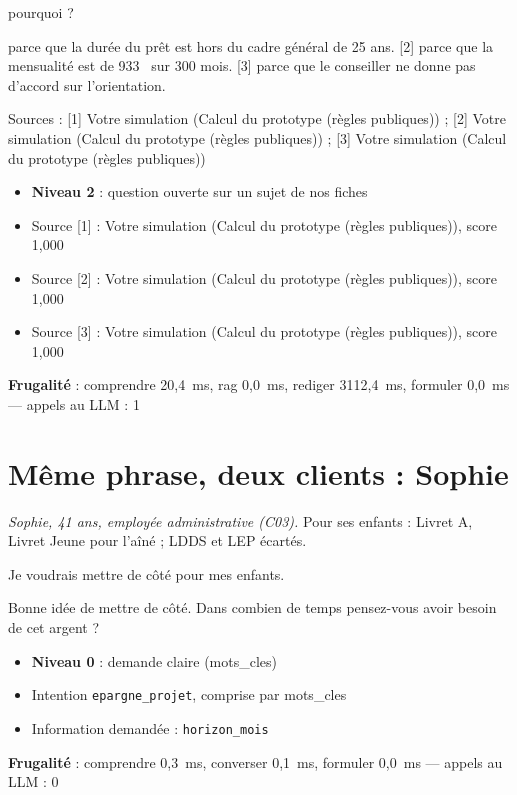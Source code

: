 \documentclass[11pt,a4paper]{article}
\newcommand{\frugal}[1]{{\scriptsize\color{darkgray}\textbf{Frugalité} : #1}\par\medskip}
\begin{document}
\begin{client}pourquoi ?\end{client}
\begin{assistant}parce que la durée du prêt est hors du cadre général de 25 ans. [2] parce que la mensualité est de 933~\texteuro{} sur 300 mois. [3] parce que le conseiller ne donne pas d'accord sur l'orientation.\par Sources : [1] Votre simulation (Calcul du prototype (règles publiques)) ; [2] Votre simulation (Calcul du prototype (règles publiques)) ; [3] Votre simulation (Calcul du prototype (règles publiques))\end{assistant}
\begin{pourquoi}
\begin{itemize}
\item \textbf{Niveau 2} : question ouverte sur un sujet de nos fiches
\item Source [1] : Votre simulation (Calcul du prototype (règles publiques)), score 1,000
\item Source [2] : Votre simulation (Calcul du prototype (règles publiques)), score 1,000
\item Source [3] : Votre simulation (Calcul du prototype (règles publiques)), score 1,000
\end{itemize}
\end{pourquoi}
\frugal{comprendre 20,4~ms, rag 0,0~ms, rediger 3112,4~ms, formuler 0,0~ms --- appels au LLM : 1}

\section{Même phrase, deux clients : Sophie}
\textit{Sophie, 41 ans, employée administrative (C03).} Pour ses enfants : Livret A, Livret Jeune pour l'aîné ; LDDS et LEP écartés.

\begin{client}Je voudrais mettre de côté pour mes enfants.\end{client}
\begin{assistant}Bonne idée de mettre de côté. Dans combien de temps pensez-vous avoir besoin de cet argent ?\end{assistant}
\begin{pourquoi}
\begin{itemize}
\item \textbf{Niveau 0} : demande claire (mots\_cles)
\item Intention \texttt{epargne\_projet}, comprise par mots\_cles
\item Information demandée : \texttt{horizon\_mois}
\end{itemize}
\end{pourquoi}
\frugal{comprendre 0,3~ms, converser 0,1~ms, formuler 0,0~ms --- appels au LLM : 0}
\end{document}
